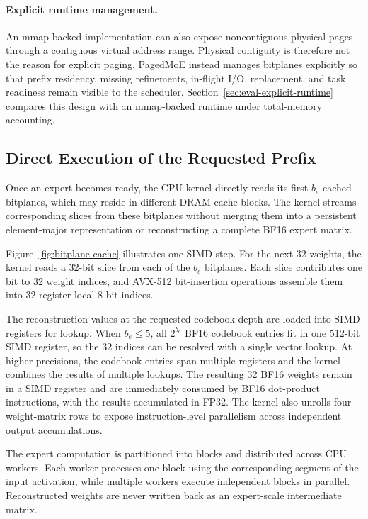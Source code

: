 \documentclass[sigconf, nonacm]{acmart}
\begin{document}
\paragraph{Explicit runtime management.}
An mmap-backed implementation can also expose noncontiguous physical pages through a contiguous virtual address range. Physical contiguity is therefore not the reason for explicit paging. PagedMoE instead manages bitplanes explicitly so that prefix residency, missing refinements, in-flight I/O, replacement, and task readiness remain visible to the scheduler. Section~\ref{sec:eval-explicit-runtime} compares this design with an mmap-backed runtime under total-memory accounting.

\subsection{Direct Execution of the Requested Prefix}
\label{sec:direct-execution}

Once an expert becomes ready, the CPU kernel directly reads its first
\(b_e\) cached bitplanes, which may reside in different DRAM cache
blocks. The kernel streams corresponding slices from these bitplanes
without merging them into a persistent element-major representation or
reconstructing a complete BF16 expert matrix.

Figure~\ref{fig:bitplane-cache} illustrates one SIMD step. For the next
32 weights, the kernel reads a 32-bit slice from each of the \(b_e\)
bitplanes. Each slice contributes one bit to 32 weight indices, and
AVX-512 bit-insertion operations assemble them into 32 register-local
8-bit indices.

The reconstruction values at the requested codebook depth are loaded
into SIMD registers for lookup. When \(b_e\leq5\), all
\(2^{b_e}\) BF16 codebook entries fit in one 512-bit SIMD register, so the
32 indices can be resolved with a single vector lookup. At higher
precisions, the codebook entries span multiple registers and the
kernel combines the results of multiple lookups. The resulting 32 BF16
weights remain in a SIMD register and are immediately consumed by BF16
dot-product instructions, with the results accumulated in FP32. The kernel also unrolls four weight-matrix rows to expose
instruction-level parallelism across independent output accumulations.

The expert computation is partitioned into blocks and distributed
across CPU workers. Each worker processes one block using the
corresponding segment of the input activation, while multiple workers
execute independent blocks in parallel. Reconstructed weights are
never written back as an expert-scale intermediate matrix.
\end{document}
